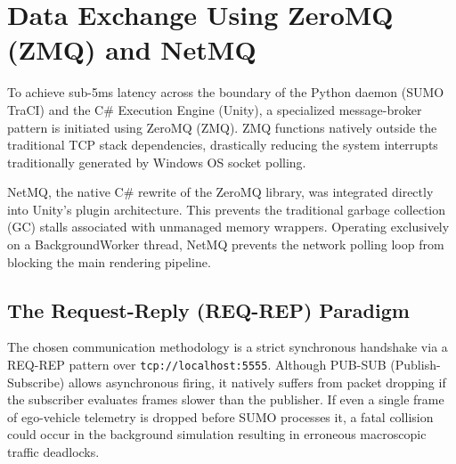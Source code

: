\section{Data Exchange Using ZeroMQ (ZMQ) and NetMQ}

To achieve sub-5ms latency across the boundary of the Python daemon (SUMO TraCI) and the C\# Execution Engine (Unity), a specialized message-broker pattern is initiated using ZeroMQ (ZMQ). ZMQ functions natively outside the traditional TCP stack dependencies, drastically reducing the system interrupts traditionally generated by Windows OS socket polling.

\begin{insightbox}
NetMQ, the native C\# rewrite of the ZeroMQ library, was integrated directly into Unity's plugin architecture. This prevents the traditional garbage collection (GC) stalls associated with unmanaged memory wrappers. Operating exclusively on a BackgroundWorker thread, NetMQ prevents the network polling loop from blocking the main rendering pipeline.
\end{insightbox}

\subsection{The Request-Reply (REQ-REP) Paradigm}

The chosen communication methodology is a strict synchronous handshake via a REQ-REP pattern over \texttt{tcp://localhost:5555}. Although PUB-SUB (Publish-Subscribe) allows asynchronous firing, it natively suffers from packet dropping if the subscriber evaluates frames slower than the publisher. If even a single frame of ego-vehicle telemetry is dropped before SUMO processes it, a fatal collision could occur in the background simulation resulting in erroneous macroscopic traffic deadlocks.

